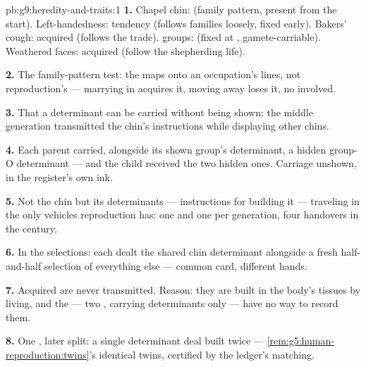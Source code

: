 \begin{solution}{pb:g9:heredity-and-traits:1}
\textbf{1.} Chapel chin:  (family pattern,
present from the start). Left-handedness: 
tendency (follows families loosely, fixed early). Bakers'
cough: acquired (follows the trade).  groups:
 (fixed at , gamete-carriable).
Weathered faces: acquired (follow the shepherding life).

\textbf{2.} The family-pattern test: the  maps onto
an occupation's lines, not reproduction's --- marrying in
acquires it, moving away loses it, no  involved.

\textbf{3.} That a determinant can be carried without
being shown: the middle generation transmitted the chin's
instructions while displaying other chins.

\textbf{4.} Each parent carried, alongside its shown
group's determinant, a hidden group-O determinant --- and
the child received the two hidden ones. Carriage unshown,
in the register's own ink.

\textbf{5.} Not the chin but its determinants ---
instructions for building it --- traveling in the only
vehicles reproduction has: one  and one  per generation, four handovers in the century.

\textbf{6.} In the selections: each  dealt
the shared chin determinant alongside a fresh half-and-half
selection of everything else --- common card, different
hands.

\textbf{7.} Acquired  are never transmitted.
Reason: they are built in the body's tissues by living,
and the  --- two , carrying determinants
only --- have no way to record them.

\textbf{8.} One , later split: a single
determinant deal built twice ---
\cref{rem:g5:human-reproduction:twins}'s identical twins,
certified by the ledger's matching.


\end{solution}
